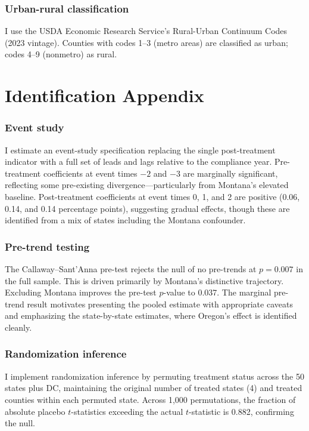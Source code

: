 \documentclass[12pt]{article}
\begin{document}
\subsubsection*{Urban-rural classification} I use the USDA Economic Research Service's Rural-Urban Continuum Codes (2023 vintage). Counties with codes 1--3 (metro areas) are classified as urban; codes 4--9 (nonmetro) as rural.

\section{Identification Appendix}
\label{app:identification}

\subsubsection*{Event study} I estimate an event-study specification replacing the single post-treatment indicator with a full set of leads and lags relative to the compliance year. Pre-treatment coefficients at event times $-2$ and $-3$ are marginally significant, reflecting some pre-existing divergence---particularly from Montana's elevated baseline. Post-treatment coefficients at event times 0, 1, and 2 are positive (0.06, 0.14, and 0.14 percentage points), suggesting gradual effects, though these are identified from a mix of states including the Montana confounder.

\subsubsection*{Pre-trend testing} The Callaway--Sant'Anna pre-test rejects the null of no pre-trends at $p = 0.007$ in the full sample. This is driven primarily by Montana's distinctive trajectory. Excluding Montana improves the pre-test $p$-value to 0.037. The marginal pre-trend result motivates presenting the pooled estimate with appropriate caveats and emphasizing the state-by-state estimates, where Oregon's effect is identified cleanly.

\subsubsection*{Randomization inference} I implement randomization inference by permuting treatment status across the 50 states plus DC, maintaining the original number of treated states (4) and treated counties within each permuted state. Across 1,000 permutations, the fraction of absolute placebo $t$-statistics exceeding the actual $t$-statistic is 0.882, confirming the null.
\end{document}
